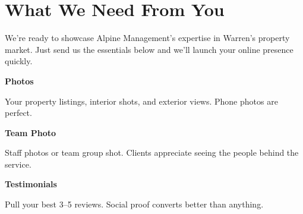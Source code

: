 \documentclass[11pt,letterpaper]{article}
\begin{document}
\vspace{0.2em}

\section*{What We Need From You}

We’re ready to showcase Alpine Management’s expertise in Warren’s property market. Just send us the essentials below and we’ll launch your online presence quickly.

\vspace{0.12em}

\noindent\begin{minipage}[t]{0.48\textwidth}
\begin{tcolorbox}[colframe=accent-teal, boxrule=1pt, left=0.7em, right=0.7em, top=0.5em, bottom=0.5em, arc=4pt, boxsep=0pt]
{\bfseries\small\color{accent-teal}Photos}

\vspace{0.15em}

{\small Your property listings, interior shots, and exterior views. Phone photos are perfect.}
\end{tcolorbox}

\vspace{0.1em}

\begin{tcolorbox}[colframe=accent-teal, boxrule=1pt, left=0.7em, right=0.7em, top=0.5em, bottom=0.5em, arc=4pt, boxsep=0pt]
{\bfseries\small\color{accent-teal}Team Photo}

\vspace{0.15em}

{\small Staff photos or team group shot. Clients appreciate seeing the people behind the service.}
\end{tcolorbox}

\vspace{0.1em}

\begin{tcolorbox}[colframe=accent-teal, boxrule=1pt, left=0.7em, right=0.7em, top=0.5em, bottom=0.5em, arc=4pt, boxsep=0pt]
{\bfseries\small\color{accent-teal}Testimonials}

\vspace{0.15em}

{\small Pull your best 3–5 reviews. Social proof converts better than anything.}
\end{tcolorbox}
\end{minipage}
\hfill
\end{document}
